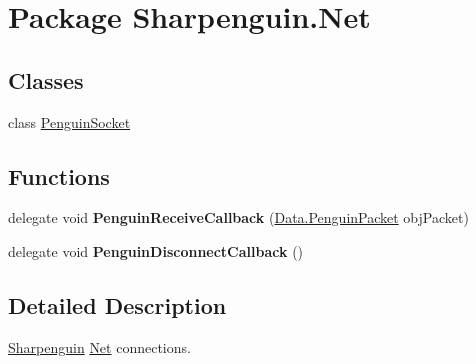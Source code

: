 \hypertarget{namespaceSharpenguin_1_1Net}{\section{\-Package \-Sharpenguin.\-Net}
\label{namespaceSharpenguin_1_1Net}
}
\subsection*{\-Classes}
\begin{DoxyCompactItemize}
\item 
class \hyperlink{classSharpenguin_1_1Net_1_1PenguinSocket}{\-Penguin\-Socket}
\end{DoxyCompactItemize}
\subsection*{\-Functions}
\begin{DoxyCompactItemize}
\item 
\hypertarget{namespaceSharpenguin_1_1Net_a9dd0c23bfe5647606a87eca32341b17b}{delegate void {\bfseries \-Penguin\-Receive\-Callback} (\hyperlink{classSharpenguin_1_1Data_1_1PenguinPacket}{\-Data.\-Penguin\-Packet} obj\-Packet)}\label{namespaceSharpenguin_1_1Net_a9dd0c23bfe5647606a87eca32341b17b}

\item 
\hypertarget{namespaceSharpenguin_1_1Net_a2a00d3d8b50911f340b3126504587edc}{delegate void {\bfseries \-Penguin\-Disconnect\-Callback} ()}\label{namespaceSharpenguin_1_1Net_a2a00d3d8b50911f340b3126504587edc}

\end{DoxyCompactItemize}


\subsection{\-Detailed \-Description}
\hyperlink{namespaceSharpenguin}{\-Sharpenguin} \hyperlink{namespaceSharpenguin_1_1Net}{\-Net} connections. 